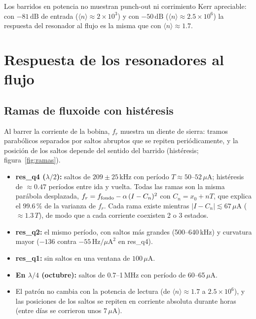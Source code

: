 \documentclass[11pt,a4paper]{article}
\newcommand{\uA}{\,\mu\mathrm{A}}
\newcommand{\kHz}{\,\mathrm{kHz}}
\newcommand{\dB}{\,\mathrm{dB}}
\newcommand{\fr}{f_r}
\begin{document}
Los barridos en potencia no muestran punch-out ni corrimiento Kerr apreciable: con $-81\dB$ de entrada
($\langle n\rangle \approx 2\times10^3$) y con $-50\dB$ ($\langle n\rangle \approx 2.5\times10^6$) la respuesta del
resonador al flujo es la misma que con $\langle n\rangle \approx 1.7$.

\section{Respuesta de los resonadores al flujo}

\subsection{Ramas de fluxoide con histéresis}

Al barrer la corriente de la bobina, $\fr$ muestra un diente de sierra: tramos parabólicos separados por saltos
abruptos que se repiten periódicamente, y la posición de los saltos depende del sentido del barrido (histéresis;
figura~\ref{fig:ramas}).

\begin{itemize}
  \item \textbf{res\_q4 ($\lambda/2$):} saltos de $209\pm25\kHz$ con período $T \approx 50$--$52\uA$; histéresis de
    $\approx 0.47$ períodos entre ida y vuelta. Todas las ramas son la misma parábola desplazada,
    $\fr = f_{\rm fondo} - \alpha\,(I-C_n)^2$ con $C_n = x_0 + nT$, que explica el $99.6\,\%$ de la varianza de $\fr$.
    Cada rama existe mientras $|I - C_n| \lesssim 67\uA$ ($\approx 1.3\,T$), de modo que a cada corriente coexisten
    2 o 3 estados.
  \item \textbf{res\_q2:} el mismo período, con saltos más grandes (500--640\,kHz) y curvatura mayor
    ($-136$ contra $-55\,\mathrm{Hz}/\mu\mathrm{A}^2$ en res\_q4).
  \item \textbf{res\_q1:} sin saltos en una ventana de $100\uA$.
  \item \textbf{En $\lambda/4$ (octubre):} saltos de 0.7--1\,MHz con período de 60--65\,$\mu$A.
  \item El patrón no cambia con la potencia de lectura (de $\langle n\rangle \approx 1.7$ a $2.5\times10^6$), y las
    posiciones de los saltos se repiten en corriente absoluta durante horas (entre días se corrieron unos $7\uA$).
\end{itemize}
\end{document}
